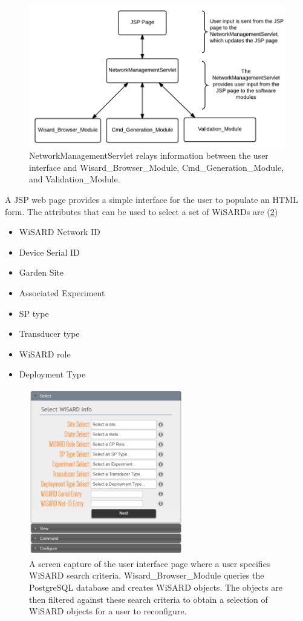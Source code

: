 \begin{figure}[H]
	\centering
	\includegraphics[width=\textwidth]{figures/jsp_interaction.png}
	\caption{NetworkManagementServlet relays information between the user interface and Wisard\_Browser\_Module, Cmd\_Generation\_Module, and Validation\_Module.}
	\label{fig:jsp_interaction}
\end{figure} 

A JSP web page provides a simple interface for the user to populate an HTML form. The attributes that can be used to select a set of WiSARDs are (\ref{fig:jsp_ui_select})

\begin{itemize}
	\item WiSARD Network ID
	\item Device Serial ID
	\item Garden Site
	\item Associated Experiment
	\item SP type
	\item Transducer type
	\item WiSARD role
	\item Deployment Type
\end{itemize} 

\begin{figure}[H]
	\centering
	\includegraphics[width=0.6\textwidth]{figures/jsp_ui_select.png}
	\caption{A screen capture of the user interface page where a user specifies WiSARD search criteria. Wisard\_Browser\_Module queries the PostgreSQL database and creates WiSARD objects. The objects are then filtered against these search criteria to obtain a selection of WiSARD objects for a user to reconfigure.}
	\label{fig:jsp_ui_select}
\end{figure}

